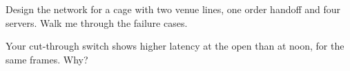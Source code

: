 \begin{interviewq}\label{iq:nw:switches-and-layer-1-devices:5}
Design the network for a cage with two venue lines, one order handoff and four servers. Walk me through the failure cases.
\end{interviewq}

\begin{interviewq}\label{iq:nw:switches-and-layer-1-devices:6}
Your cut-through switch shows higher latency at the open than at noon, for the same frames. Why?
\end{interviewq}
